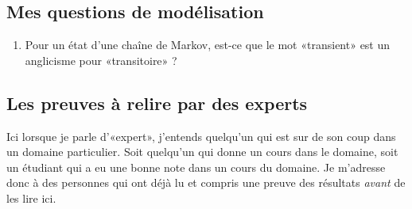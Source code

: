 \subsection{Mes questions de modélisation}

\begin{enumerate}
    \item
        Pour un état d'une chaîne de Markov, est-ce que le mot «transient» est un anglicisme pour «transitoire» ?
\end{enumerate}


\subsection{Les preuves à relire par des experts}

Ici lorsque je parle d'«expert», j'entends quelqu'un qui est sur de son coup dans un domaine particulier. Soit quelqu'un qui donne un cours dans le domaine, soit un étudiant qui a eu une bonne note dans un cours du domaine. Je m'adresse donc à des personnes qui ont déjà lu et compris une preuve des résultats \emph{avant} de les lire ici.

